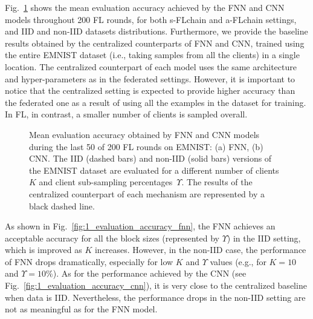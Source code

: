 \documentclass[lettersize,journal]{IEEEtran}
\begin{document}
Fig.~\ref{fig:1_evaluation_accuracy} shows the mean evaluation accuracy achieved by the FNN and CNN models throughout 200 FL rounds, for both s-FLchain and a-FLchain settings, and IID and non-IID datasets distributions. Furthermore, we provide the baseline results obtained by the centralized counterparts of FNN and CNN, trained using the entire EMNIST dataset (i.e., taking samples from all the clients) in a single location. The centralized counterpart of each model uses the same architecture and hyper-parameters as in the federated settings. However, it is important to notice that the centralized setting is expected to provide higher accuracy than the federated one as a result of using all the examples in the dataset for training. In FL, in contrast, a smaller number of clients is sampled overall.

\begin{figure}[ht!]
	\centering
	\caption{Mean evaluation accuracy obtained by FNN and CNN models during the last 50 of 200 FL rounds on EMNIST: (a) FNN, (b) CNN. The IID (dashed bars) and non-IID (solid bars) versions of the EMNIST dataset are evaluated for a different number of clients $K$ and client sub-sampling percentages~$\Upsilon$. The results of the centralized counterpart of each mechanism are represented by a black dashed line.}
	\label{fig:1_evaluation_accuracy}
\end{figure}

As shown in Fig.~\ref{fig:1_evaluation_accuracy_fnn}, the FNN achieves an acceptable accuracy for all the block sizes (represented by $\Upsilon$) in the IID setting, which is improved as $K$ increases. However, in the non-IID case, the performance of FNN drops dramatically, especially for low $K$ and $\Upsilon$ values (e.g., for $K=10$ and $\Upsilon=10\%$). As for the performance achieved by the CNN (see Fig.~\ref{fig:1_evaluation_accuracy_cnn}), it is very close to the centralized baseline when data is IID. Nevertheless, the performance drops in the non-IID setting are not as meaningful as for the FNN model.
\end{document}
